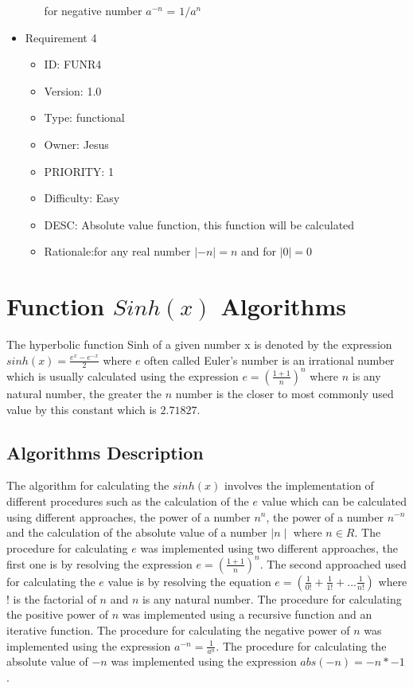 \documentclass[12pt]{report}
\begin{document}
\begin{itemize}
\begin{itemize}
for negative number $a^{-n}$ = $1/a^{n}$
\end{itemize}
\item Requirement 4
\begin{itemize}
\item ID:       FUNR4
\item Version:  1.0
\item Type:     functional
\item Owner:    Jesus
\item PRIORITY: 1 
\item Difficulty: Easy
\item DESC: Absolute value function, this function will be calculated
\item Rationale:for any real number $|−n| = n$  and for $|0| = 0$
\end{itemize}
\end{itemize}

\newpage
\section{Function $Sinh(x)$ Algorithms}
\noindent The hyperbolic function Sinh of a given number x is denoted by the expression $sinh(x)= \frac{e^x- e^{-x}}{2}$ where $e$ often called Euler's number is an irrational number which is usually calculated using the expression $e= (\frac{1+1}{n})^n$ where $n$ is any natural number, the greater the $n$ number is the closer to most commonly used value by this constant which is $2.71827$.   \\
\noindent
\subsection{Algorithms Description}
The algorithm for calculating the $sinh(x)$ involves the implementation of different procedures such as the calculation of the $e$ value which can be calculated using different approaches, the power of a number $n^n$, the power of a number $n^{-n}$ and the calculation of the absolute value of a number $\mid n \mid$ where $n \in {R}$. 
\noindent
\newline
The procedure for calculating $e$ was implemented using two different approaches, the first one is by resolving the expression $e= (\frac{1+1}{n})^n$. The second approached used for calculating the $e$ value is by resolving the equation $e= (\frac{1}{0!} + \frac{1}{1!}+...\frac{1}{n!})$ where $!$ is the factorial of $n$ and $n$ is any natural number. 
\newline
\newline
The procedure for calculating the positive power of $n$ was implemented using a recursive function and an iterative function.
\newline
The procedure for calculating the negative power of $n$ was implemented using the expression $a^{-n} = \frac{1}{a^n}$.
\newline
The procedure for calculating the absolute value of $-n$ was implemented using the expression $abs(-n) = -n*-1$.
\end{document}
